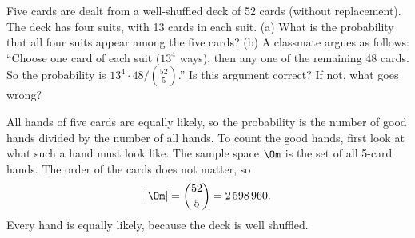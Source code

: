 
\begin{problem}
	Five cards are dealt from a well-shuffled deck of 52 cards (without
	replacement). The deck has four suits, with 13 cards in each suit.
	(a) What is the probability that all four suits appear among the five
	cards?
	(b) A classmate argues as follows: ``Choose one card of each suit
	($13^4$ ways), then any one of the remaining 48 cards. So the probability
	is $13^4\cdot48/\binom{52}{5}$.'' Is this argument correct? If not, what
	goes wrong?
\end{problem}

\begin{solution}
	\idea All hands of five cards are equally likely, so the probability is
	the number of good hands divided by the number of all hands. To count the good hands, first look at what such a hand must look like.
	 The sample space $\Om$ is the set of all 5-card hands. The order
	of the cards does not matter, so
	\[ |\Om|=\binom{52}{5}=2\,598\,960. \]
	Every hand is equally likely, because the deck is well shuffled.


\end{solution}
